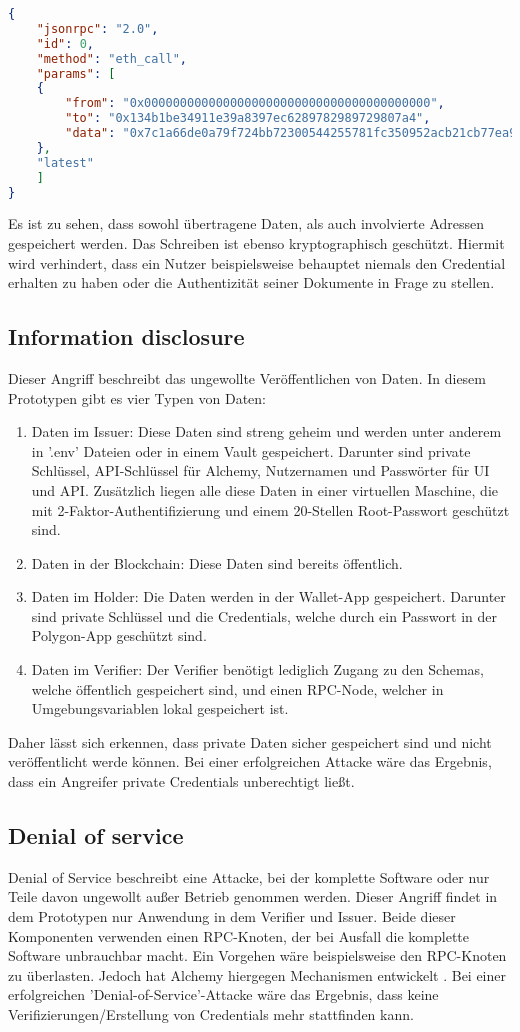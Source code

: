 \begin{lstlisting}[language=json,firstnumber=1]
{
	"jsonrpc": "2.0",
	"id": 0,
	"method": "eth_call",
	"params": [
	{
		"from": "0x0000000000000000000000000000000000000000",
		"to": "0x134b1be34911e39a8397ec6289782989729807a4",
		"data": "0x7c1a66de0a79f724bb72300544255781fc350952acb21cb77ea9a719c8eebb7d1a055ad0"
	},
	"latest"
	]
}
\end{lstlisting}	
Es ist zu sehen, dass sowohl übertragene Daten, als auch involvierte Adressen gespeichert werden. Das Schreiben ist ebenso kryptographisch geschützt. Hiermit wird verhindert, dass ein Nutzer beispielsweise behauptet niemals den Credential erhalten zu haben oder die Authentizität seiner Dokumente in Frage zu stellen. 

\subsection{Information disclosure}
\label{disclosure}
Dieser Angriff beschreibt das ungewollte Veröffentlichen von Daten. In diesem Prototypen gibt es vier Typen von Daten:
\begin{enumerate}
	\item Daten im Issuer: Diese Daten sind streng geheim und werden unter anderem in '.env' Dateien oder in einem Vault gespeichert. Darunter sind private Schlüssel, API-Schlüssel für Alchemy, Nutzernamen und Passwörter für UI und API. Zusätzlich liegen alle diese Daten in einer virtuellen Maschine, die mit 2-Faktor-Authentifizierung und einem 20-Stellen Root-Passwort geschützt sind.
	\item Daten in der Blockchain: Diese Daten sind bereits öffentlich.
	\item Daten im Holder: Die Daten werden in der Wallet-App gespeichert. Darunter sind private Schlüssel und die Credentials, welche durch ein Passwort in der Polygon-App geschützt sind.
	\item Daten im Verifier: Der Verifier benötigt lediglich Zugang zu den Schemas, welche öffentlich gespeichert sind, und einen RPC-Node, welcher in Umgebungsvariablen lokal gespeichert ist.
\end{enumerate}
Daher lässt sich erkennen, dass private Daten sicher gespeichert sind und nicht veröffentlicht werde können. Bei einer erfolgreichen Attacke wäre das Ergebnis, dass ein Angreifer private Credentials unberechtigt ließt.

\subsection{Denial of service}
Denial of Service beschreibt eine Attacke, bei der komplette Software oder nur Teile davon ungewollt außer Betrieb genommen werden. Dieser Angriff findet in dem Prototypen nur Anwendung in dem Verifier und Issuer. Beide dieser Komponenten verwenden einen RPC-Knoten, der bei Ausfall die komplette Software unbrauchbar macht. Ein Vorgehen wäre beispielsweise den RPC-Knoten zu überlasten. Jedoch hat Alchemy hiergegen Mechanismen entwickelt \cite{ID61}. Bei einer erfolgreichen 'Denial-of-Service'-Attacke wäre das Ergebnis, dass keine Verifizierungen/Erstellung von Credentials mehr stattfinden kann.

